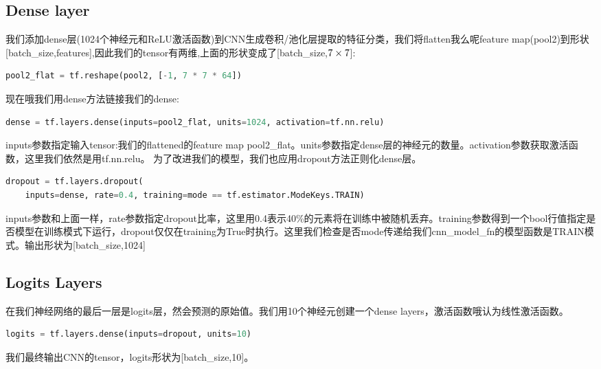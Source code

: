 \subsection{Dense layer}
我们添加dense层(1024个神经元和ReLU激活函数)到CNN生成卷积/池化层提取的特征分类，我们将flatten我么呢feature map(pool2)到形状[batch\_size,features],因此我们的tensor有两维,上面的形状变成了[batch\_size,$7\times7\time64$]:
\begin{lstlisting}[language=Python]
pool2_flat = tf.reshape(pool2, [-1, 7 * 7 * 64])
\end{lstlisting}
现在哦我们用dense方法链接我们的dense:
\begin{lstlisting}[language=Python]
dense = tf.layers.dense(inputs=pool2_flat, units=1024, activation=tf.nn.relu)
\end{lstlisting}
inputs参数指定输入tensor:我们的flattened的feature map pool2\_flat。units参数指定dense层的神经元的数量。activation参数获取激活函数，这里我们依然是用tf.nn.relu。
为了改进我们的模型，我们也应用dropout方法正则化dense层。
\begin{lstlisting}[language=Python]
dropout = tf.layers.dropout(
    inputs=dense, rate=0.4, training=mode == tf.estimator.ModeKeys.TRAIN)
\end{lstlisting}
inputs参数和上面一样，rate参数指定dropout比率，这里用0.4表示40\%的元素将在训练中被随机丢弃。training参数得到一个bool行值指定是否模型在训练模式下运行，dropout仅仅在training为True时执行。这里我们检查是否mode传递给我们cnn\_model\_fn的模型函数是TRAIN模式。输出形状为[batch\_size,1024]
\subsection{Logits Layers}
在我们神经网络的最后一层是logits层，然会预测的原始值。我们用10个神经元创建一个dense layers，激活函数哦认为线性激活函数。
\begin{lstlisting}[language=Python]
logits = tf.layers.dense(inputs=dropout, units=10)
\end{lstlisting}
我们最终输出CNN的tensor，logits形状为[batch\_size,10]。
